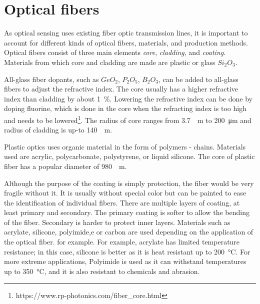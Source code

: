 \section{Optical fibers}\label{txt.optical.fibers}


As optical sensing uses existing fiber optic transmission lines, it is important to account for different kinds of optical fibers, materials, and production methods. Optical fibers consist of three main elements \textit{core}, \textit{cladding}, and \textit{coating}. Materials from which core and cladding are made are plastic or glass $Si_2O_3$. 

All-glass fiber dopants, such as $GeO_2$, $P_2O_5$, $B_2O_3$, can be added to all-glass fibers to adjust the refractive index. The core usually has a higher refractive index than cladding by about \qty{1}{\si{\percent}}. Lowering the refractive index can be done by doping fluorine, which is done in the core when the refracting index is too high and needs to be lowered\footnote{https://www.rp-photonics.com/fiber\_core.html}. The radius of core ranges from \qty{3.7}{\si{\micro}\meter} to \qty{200}{\micro\meter} and radius of cladding is up-to \qty{140}{\si{\micro}\meter}\cite{cabling}.

Plastic optics uses organic material in the form of polymers - chains. Materials used are acrylic, polycarbonate, polystyrene, or liquid silicone. The core of plastic fiber has a popular diameter of \qty{980}{\si{\micro}\meter}.

Although the purpose of the coating is simply protection, the fiber would be very fragile without it. It is usually without special color but can be painted to ease the identification of individual fibers. There are multiple layers of coating, at least primary and secondary. The primary coating is softer to allow the bending of the fiber. Secondary is harder to protect inner layers. Materials such as acrylate, silicone, polyimide,e or carbon are used depending on the application of the optical fiber. for example. For example, acrylate has limited temperature resistance; in this case, silicone is better as it is heat resistant up to \qty{200}{\celsius}\cite{cabling}. For more extreme applications, Polyimide is used as it can withstand temperatures up to \qty{350}{\celsius}, and it is also resistant to chemicals and abrasion\cite{cabling}.


